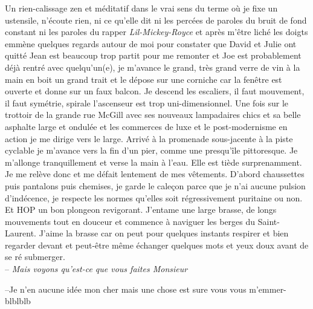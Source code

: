Un rien-calissage zen et méditatif dans le vrai
sens du terme où je fixe un ustensile, n'écoute rien, ni ce qu'elle dit ni les
percées de paroles du bruit de fond constant ni les paroles du rapper
\textit{Lil-Mickey-Royce} 
et après m'être liché les doigts emmène quelques regards autour de moi pour
constater que David et Julie ont quitté Jean est beaucoup trop partit pour me
remonter et Joe est probablement déjà rentré avec quelqu'un(e), je m'avance le 
grand, très grand verre de vin à la main en boit un grand trait et le dépose
sur une corniche car la fenêtre est ouverte et donne sur un faux balcon.
Je descend les escaliers, il faut mouvement, il faut symétrie, spirale 
l'ascenseur est trop uni-dimensionnel.
Une fois sur le trottoir de la grande rue McGill avec ses nouveaux lampadaires
chics et sa belle asphalte large et ondulée et les commerces de luxe et le
post-modernisme en action je me dirige vers le large. Arrivé à la promenade
sous-jacente à la piste cyclable je m'avance vers la fin d'un pier, comme une 
presqu'île pittoresque. Je m'allonge tranquillement et verse la main à l'eau.
Elle est tiède surprenamment. Je me relève donc et me défait lentement de mes
vêtements. D'abord chaussettes puis pantalons puis chemises, je garde le caleçon parce
que je n'ai aucune pulsion d'indécence, je respecte les normes qu'elles soit 
régressivement puritaine ou non.\\

Et HOP un bon plongeon revigorant. 
J'entame une large brasse, de longs mouvements tout en douceur et commence
à naviguer les berges du Saint-Laurent.
J'aime la brasse car on peut pour quelques instants respirer et bien regarder
devant et peut-être même échanger quelques mots et yeux doux avant de se
ré submerger.\\

\hfill\noindent --\textit{ Mais voyons qu'est-ce que vous faites Monsieur}

\vspace{1em}
--Je n'en aucune idée mon cher mais une chose est
sure vous vous m'emmer-blblblb


